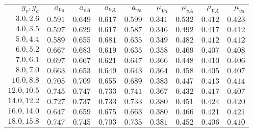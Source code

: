 {\small%
\begin{tabular}{r|rrrrrrrr}
$g_v,g_a$ & $a_{\mathit{Va}}$ & $a_{\mathit{vA}}$ & $a_{\mathit{VA}}$ & $a_{\mathit{va}}$ & $\mu_{\mathit{Va}}$ & $\mu_{\mathit{vA}}$ & $\mu_{\mathit{VA}}$ & $\mu_{\mathit{va}}$\\
$3.0,2.6$ & $0.591$ & $0.649$ & $0.617$ & $0.599$ & $0.341$ & $0.532$ & $0.412$ & $0.423$\\
$4.0,3.5$ & $0.597$ & $0.629$ & $0.617$ & $0.587$ & $0.346$ & $0.492$ & $0.417$ & $0.412$\\
$5.0,4.4$ & $0.589$ & $0.655$ & $0.681$ & $0.635$ & $0.349$ & $0.482$ & $0.412$ & $0.412$\\
$6.0,5.2$ & $0.667$ & $0.683$ & $0.619$ & $0.635$ & $0.358$ & $0.469$ & $0.407$ & $0.408$\\
$7.0,6.1$ & $0.697$ & $0.667$ & $0.621$ & $0.647$ & $0.366$ & $0.448$ & $0.410$ & $0.406$\\
$\mathbf{8.0,7.0}$ & $\mathbf{0.663}$ & $\mathbf{0.653}$ & $\mathbf{0.649}$ & $\mathbf{0.643}$ & $\mathbf{0.364}$ & $\mathbf{0.458}$ & $\mathbf{0.405}$ & $\mathbf{0.407}$\\
$10.0,8.8$ & $0.705$ & $0.709$ & $0.655$ & $0.689$ & $0.383$ & $0.447$ & $0.413$ & $0.414$\\
$12.0,10.5$ & $0.745$ & $0.747$ & $0.733$ & $0.741$ & $0.367$ & $0.432$ & $0.417$ & $0.407$\\
$14.0,12.2$ & $0.727$ & $0.737$ & $0.733$ & $0.733$ & $0.380$ & $0.451$ & $0.424$ & $0.420$\\
$16.0,14.0$ & $0.647$ & $0.659$ & $0.675$ & $0.663$ & $0.380$ & $0.466$ & $0.421$ & $0.421$\\
$18.0,15.8$ & $0.747$ & $0.745$ & $0.703$ & $0.735$ & $0.381$ & $0.452$ & $0.406$ & $0.410$\\
\end{tabular}
}